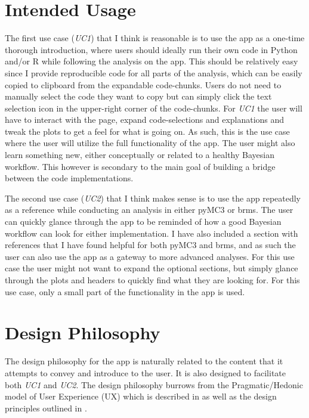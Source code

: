 \documentclass[12pt]{article}
\begin{document}
\section{Intended Usage}
The first use case (\emph{UC1}) that I think is reasonable is to use the app as a one-time
thorough introduction, where users should ideally run their own code in Python and/or R
while following the analysis on the app. This should be relatively easy since I provide reproducible code
for all parts of the analysis, which can be easily copied to clipboard from the expandable
code-chunks. Users do not need to manually select the code they want to copy but can simply click
the text selection icon in the upper-right corner of the code-chunks.
For \emph{UC1} the user will have to interact with the page,
expand code-selections and explanations and tweak the plots to get a feel for what is going on.
As such, this is the use case where the user will utilize the full
functionality of the app.
The user might also learn something new, either conceptually or related to a
healthy Bayesian workflow.
This however is secondary to the main goal of building a bridge between the code implementations.

\vspace{5mm}

The second use case (\emph{UC2}) that I think makes sense is to use the app repeatedly as a reference
while conducting an analysis in either pyMC3 or brms. The user can quickly glance through the
app to be reminded of how a good Bayesian workflow can look for either implementation.
I have also included a section with references that I have found helpful for both pyMC3 and brms,
and as such the user can also use the app as a gateway to more advanced analyses.
For this use case the user might not want to expand the optional sections,
but simply glance through the plots and headers to quickly find what they are looking for.
For this use case, only a small part of the functionality in the app is used.

\section{Design Philosophy}
The design philosophy for the app is naturally related to the content that it attempts to convey and
introduce to the user. It is also designed to facilitate both \emph{UC1} and
\emph{UC2}. The design philosophy burrows from the Pragmatic/Hedonic model of
User Experience (UX) which is described in \textcite{hassenzahl2010experience} as well as the design
principles outlined in \textcite{mills1992macintosh}.
\end{document}
